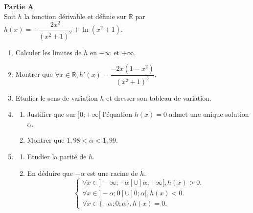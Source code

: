 \documentclass[12pt,a4paper]{article}
\begin{document}
\noindent \underline{\textbf{Partie A}} \\
Soit $h$ la fonction dérivable et définie sur $\mathbb{R}$ par $h(x) = -\dfrac{2x^2}{(x^2+1)^2} + \ln(x^2 + 1)$.
\begin{enumerate}
    \item Calculer les limites de $h$ en $-\infty$ et $+\infty$.
    \item Montrer que $\forall x \in \mathbb{R}, h'(x) = \dfrac{-2x(1-x^2)}{(x^2+1)^3}$.
    \item Etudier le sens de variation $h$ et dresser son tableau de variation.
    \item \begin{enumerate}
        \item Justifier que sur $]0; +\infty[$ l'équation $h(x) = 0$ admet une unique solution $\alpha$.
        \item Montrer que $1,98 < \alpha < 1,99$.
    \end{enumerate}
    \item \begin{enumerate}
        \item Etudier la parité de $h$.\\ 
        \item En déduire que $-\alpha$ est une racine de $h$.
        \[ \begin{cases} \forall x \in ]-\infty; -\alpha[ \cup ]\alpha; +\infty[, h(x) > 0. \\ \forall x \in ]-\alpha; 0[ \cup ]0; \alpha[, h(x) < 0. \\ \forall x \in \{-\alpha; 0; \alpha\}, h(x) = 0. \end{cases} \]
    \end{enumerate}
\end{enumerate}

\vspace{0.5cm}
\end{document}
